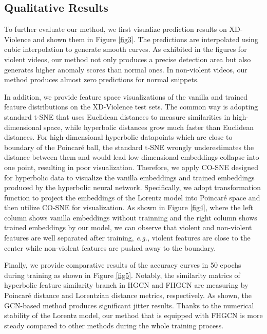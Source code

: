 \documentclass[sigconf]{acmart}
\newcommand{\eg}{{\emph{e.g., }}}
\newcommand{\poincare}{Poincar\'e }
\begin{document}
\subsection{Qualitative Results}
To further evaluate our method, we first visualize prediction results on XD-Violence and shown them in Figure \ref{fig3}. The predictions are interpolated using cubic interpolation to generate smooth curves. As exhibited in the figures for violent videos, our method not only produces a precise detection area but also generates higher anomaly scores than normal ones. In non-violent videos, our method produces almost zero predictions for normal snippets. 

In addition, we provide feature space visualizations of the vanilla and trained feature distributions on the XD-Violence test sets. The common way is adopting standard t-SNE \cite{Maaten_Hinton_2008} that uses Euclidean distances to measure similarities in high-dimensional space, while hyperbolic distances grow much faster than Euclidean distances. For high-dimensional hyperbolic datapoints which are close to boundary of the \poincare ball, the standard t-SNE wrongly underestimates the distance between them and would lead low-dimensional embeddings collapse into one point, resulting in poor visualization\cite{guo2022co}. Therefore, we apply CO-SNE \cite{guo2022co} designed for hyperbolic data to visualize the vanilla embeddings and trained embeddings produced by the hyperbolic neural network. Specifically, we adopt transformation function to project the embeddings of the Lorentz model into \poincare space and then utilize CO-SNE for visualization. As shown in Figure \ref{fig4}, where the left column shows vanilla embeddings without trainning and the right column shows trained embeddings by our model, we can observe that violent and non-violent features are well separated after training, \eg violent features are close to the center while non-violent features are pushed away to the boundary. 

Finally, we provide comparative results of the accuracy curves in 50 epochs during training as shown in Figure \ref{fig5}. Notably, the similarity matrics of hyperbolic feature similarity branch in HGCN and FHGCN are measuring by \poincare distance and Lorentzian distance metrics, respectively. As shown, the GCN-based method produces significant jitter results. Thanks to the numerical stability of the Lorentz model, our method that is equipped with FHGCN is more steady compared to other methods during the whole training process. 
\end{document}
